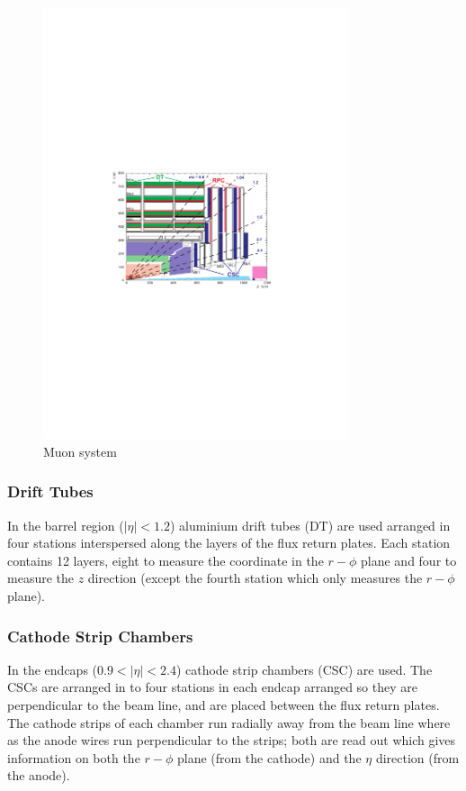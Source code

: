 \begin{figure}[htbp]
  \centering
  \includegraphics[width=0.8\textwidth]{muon_system}
  \caption{Muon system}
  \label{fig:muon_system}
\end{figure}

\subsubsection{Drift Tubes}
In the barrel region ($|\eta| < 1.2$) aluminium drift tubes (DT) are used
arranged in four stations interspersed along the layers of the flux return
plates. 
Each station contains 12 layers, eight to measure the coordinate in the
$r-\phi$ plane and four to measure the $z$ direction (except the fourth station
which only measures the $r-\phi$ plane). 

\subsubsection{Cathode Strip Chambers}
In the endcaps ($0.9<|\eta|<2.4$) cathode strip chambers (CSC) are used. The
CSCs are arranged in to four stations in each endcap arranged so they are
perpendicular to the beam line, and are placed between the flux return plates.
The cathode strips of each chamber run radially away from the beam line where
as the anode wires run perpendicular to the strips; both are read out which
gives information on both the $r-\phi$ plane (from the cathode) and the $\eta$
direction (from the anode). \cite{cms}

